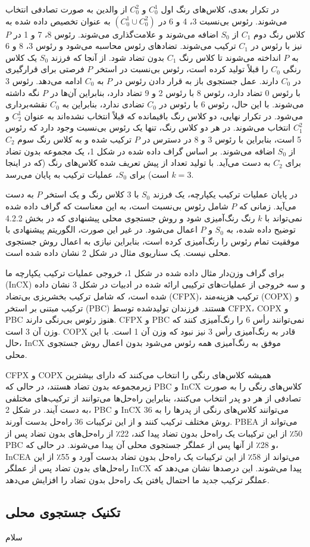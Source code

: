 \documentclass[a4paper,10pt]{article}
\begin{document}
                در تکرار بعدی، کلاس‌های رنگ اول $C_0^1$ و $C_0^2$ از والدین به صورت تصادفی انتخاب می‌شوند. رئوس بی‌نسبت 3، 4 و 6 در $(C_0^1 \cup C_0^2)$ به عنوان تخصیص داده شده به کلاس رنگ دوم $C_1$ از $S_0$ اضافه می‌شوند و علامت‌گذاری می‌شوند. رئوس 8، 7 و 1 در $P$ نیز با رئوس در $C_1$ ترکیب می‌شوند. تضادهای رئوس محاسبه می‌شود و رئوس 3، 8 و 6 به $P$ انداخته می‌شوند تا کلاس رنگ $C_1$ بدون تضاد شود. از آنجا که فرزند $S_0$ یک کلاس رنگی $C_0$ را قبلاً تولید کرده است، رئوس بی‌نسبت در استخر $P$ فرصتی برای قرارگیری در $C_0$ دارند. عمل جستجوی باز به قرار دادن رئوس در $P$ به $C_0$ ادامه می‌دهد. رئوس 3 با رئوس 0 تضاد دارد، رئوس 8 با رئوس 2 و 9 تضاد دارد، بنابراین آن‌ها در $P$ نگه داشته می‌شوند. با این حال، رئوس 6 با رئوس در $C_0$ تضادی ندارد، بنابراین به $C_0$ نقشه‌برداری می‌شود. در تکرار نهایی، دو کلاس رنگ باقیمانده که قبلاً انتخاب نشده‌اند به عنوان $C_2^1$ و $C_1^2$ انتخاب می‌شوند. در هر دو کلاس رنگ، تنها یک رئوس بی‌نسبت وجود دارد که رئوس 5 است، بنابراین با رئوس 3 و 8 در دسترس در $P$ ترکیب شده و به کلاس رنگ سوم $C_2$ از $S_0$ اضافه می‌شوند. بر اساس گراف داده شده در شکل 1، یک مجموعه بدون تضاد برای $C_2$ به دست می‌آید. با تولید تعداد از پیش تعریف شده کلاس‌های رنگ (که در اینجا $k = 3$ است) برای $S_0$، عملیات ترکیب به پایان می‌رسد.

                در پایان عملیات ترکیب یکپارچه، یک فرزند $S_0$ با 3 کلاس رنگ و یک استخر $P$ به دست می‌آید. زمانی که $P$ شامل رئوس بی‌نسبت است، به این معناست که گراف داده شده نمی‌تواند با $k$ رنگ رنگ‌آمیزی شود و روش جستجوی محلی پیشنهادی که در بخش 4.2.2 توضیح داده شده، به $S_0$ و $P$ اعمال می‌شود. در غیر این صورت، الگوریتم پیشنهادی با موفقیت تمام رئوس را رنگ‌آمیزی کرده است، بنابراین نیازی به اعمال روش جستجوی محلی نیست. یک سناریوی مثال در شکل 2 نشان داده شده است.

                برای گراف وزن‌دار مثال داده شده در شکل 1، خروجی عملیات ترکیب یکپارچه ما (InCX) و سه خروجی از عملیات‌های ترکیبی ارائه شده در ادبیات در شکل 3 نشان داده شده است، که شامل ترکیب بخشریزی بی‌تضاد (CFPX)، ترکیب هزینه‌مند (COPX) و ترکیب مبتنی بر استخر (PBC) هستند. فرزندان تولیدشده توسط CFPX، COPX و PBC هنوز رئوس بی‌رنگی دارند. CFPX و PBC نمی‌توانند رأس 6 را رنگ‌آمیزی کنند که وزن آن 3 است. COPX قادر به رنگ‌آمیزی رأس 3 نیز نبود که وزن آن 1 است. با این حال، InCX موفق به رنگ‌آمیزی همه رئوس می‌شود بدون اعمال روش جستجوی محلی.

                CFPX و COPX همیشه کلاس‌های رنگی را انتخاب می‌کنند که دارای بیشترین زیرمجموعه بدون تضاد هستند، در حالی که PBC و InCX کلاس‌های رنگی را به صورت تصادفی از هر دو پدر انتخاب می‌کنند، بنابراین راه‌حل‌ها می‌توانند از ترکیب‌های مختلفی به دست آیند. در شکل 2، PBC و InCX می‌توانند کلاس‌های رنگی از پدرها را به 36 روش مختلف ترکیب کنند و از این ترکیبات 36 راه‌حل بدست آورند. PBEA می‌تواند از 50٪ از این ترکیبات یک راه‌حل بدون تضاد پیدا کند، 22٪ از راه‌حل‌های بدون تضاد پس از PBC و 28٪ از آنها پس از عملگر جستجوی محلی آن پیدا می‌شوند. در حالی که، InCEA می‌تواند از 58٪ از این ترکیبات یک راه‌حل بدون تضاد بدست آورد و 55٪ از این راه‌حل‌های بدون تضاد پس از عملگر InCX پیدا می‌شوند. این درصدها نشان می‌دهد که عملگر ترکیب جدید ما احتمال یافتن یک راه‌حل بدون تضاد را افزایش می‌دهد.

        \subsection{تکنیک جستجوی محلی}
            
            سلام
\end{document}
